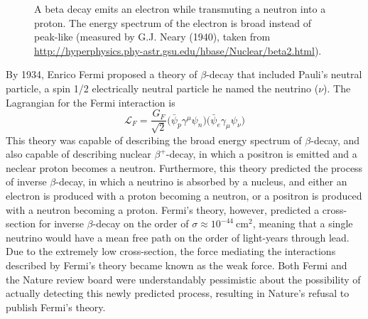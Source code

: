 \documentclass[/main.tex]{subfiles}
\begin{document}
\begin{figure}[t]
  \centering
  \caption[Beta decay and energy spectrum]{\label{fig:beta}
    A beta decay emits an electron while transmuting a neutron into a proton. The energy spectrum of the electron is broad instead of peak-like (measured by G.J. Neary (1940), taken from \url{http://hyperphysics.phy-astr.gsu.edu/hbase/Nuclear/beta2.html}).
  }
\end{figure}
By 1934, Enrico Fermi proposed a theory of $\beta$-decay that included Pauli's neutral particle, a spin 1/2 electrically neutral particle he named the neutrino ($\nu$)\cite{Fermi1934}.
The Lagrangian for the Fermi interaction is
\begin{equation}
  \mathcal{L}_F=\frac{G_F}{\sqrt{2}}\big(\bar \psi_p \gamma^\mu \psi_n\big)\big(\bar \psi_e \gamma_\mu \psi_\nu\big)
\end{equation}
This theory was capable of describing the broad energy spectrum of $\beta$-decay, and also capable of describing nuclear $\beta^+$-decay, in which a positron is emitted and a neclear proton becomes a neutron.
Furthermore, this theory predicted the process of inverse $\beta$-decay, in which a neutrino is absorbed by a nucleus, and either an electron is produced with a proton becoming a neutron, or a positron is produced with a neutron becoming a proton.
Fermi's theory, however, predicted a cross-section for inverse $\beta$-decay on the order of $\sigma\approx10^{-44}~\mathrm{cm}^2$, meaning that a single neutrino would have a mean free path on the order of light-years through lead.
Due to the extremely low cross-section, the force mediating the interactions described by Fermi's theory became known as the weak force.
Both Fermi and the Nature review board were understandably pessimistic about the possibility of actually detecting this newly predicted process, resulting in Nature's refusal to publish Fermi's theory\cite{Pais1988}.
\end{document}

